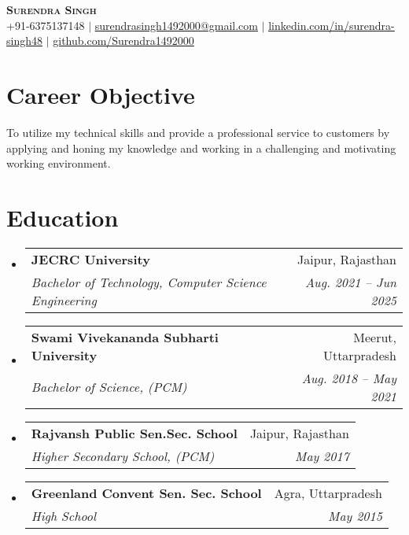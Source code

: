 \documentclass[letterpaper,11pt]{article}
\makeatletter
\newcommand{\resumeItem}[1]{
  \item\small{
    {#1 \vspace{-2pt}}
  }
}
\newcommand{\resumeSubheading}[4]{
  \vspace{-2pt}\item
    \begin{tabular*}{0.97\textwidth}[t]{l@{\extracolsep{\fill}}r}
      \textbf{#1} & #2 \\
      \textit{\small#3} & \textit{\small #4} \\
    \end{tabular*}\vspace{-7pt}
}
\newcommand{\resumeSubHeadingListStart}{\begin{itemize}[leftmargin=0.15in, label={}]}
\newcommand{\resumeSubHeadingListEnd}{\end{itemize}}
\makeatother
\begin{document}

\begin{center}
    \textbf{\Huge \scshape Surendra Singh} \\ \vspace{1pt}
    \small +91-6375137148 $|$ \href{mailto:x@x.com}{\underline{surendrasingh1492000@gmail.com}} $|$ 
    \href{https://linkedin.com/in/...}{\underline{linkedin.com/in/surendra-singh48}}
    $|$
    \href{https://github.com/...}{\underline{github.com/Surendra1492000}}
\end{center}
\section{Career Objective}
    \resumeItem{}
    {To utilize my technical skills and provide a professional service to customers by applying and honing my knowledge and working in a challenging and motivating working environment.
        }



\section{Education}
  \resumeSubHeadingListStart
    \resumeSubheading
      {JECRC University}{Jaipur, Rajasthan}
      {Bachelor of Technology, Computer Science Engineering}{Aug. 2021 -- Jun 2025}
    \resumeSubheading
      {Swami Vivekananda Subharti University}{Meerut, Uttarpradesh}
      {Bachelor of Science, (PCM)}{Aug. 2018 -- May 2021}
    \resumeSubheading
      {Rajvansh Public Sen.Sec. School}{Jaipur, Rajasthan}
      {Higher Secondary School, (PCM)}{May 2017}
    \resumeSubheading
      {Greenland Convent Sen. Sec. School}{Agra, Uttarpradesh}
      {High School}{May 2015}
  \resumeSubHeadingListEnd


\end{document}
